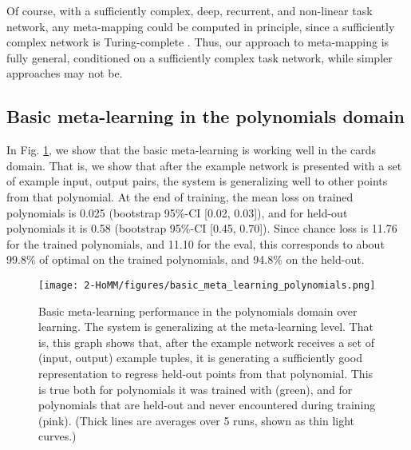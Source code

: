 Of course, with a sufficiently complex, deep, recurrent, and non-linear task network, any meta-mapping could be computed in principle, since a sufficiently complex network is Turing-complete \citep{Siegelman1992}. Thus, our approach to meta-mapping is fully general, conditioned on a sufficiently complex task network, while simpler approaches may not be.


\subsection{Basic meta-learning in the polynomials domain}

In Fig. \ref{supp_fig:HoMM:polynomials_basic_meta_learning}, we show that the basic meta-learning is working well in the cards domain. That is, we show that after the example network is presented with a set of example input, output pairs, the system is generalizing well to other points from that polynomial. At the end of training, the mean loss on trained polynomials is 0.025 (bootstrap 95\%-CI [0.02, 0.03]), and for held-out polynomials it is 0.58 (bootstrap 95\%-CI [0.45, 0.70]). Since chance loss is 11.76 for the trained polynomials, and 11.10 for the eval, this corresponds to about 99.8\% of optimal on the trained polynomials, and 94.8\% on the held-out.

\begin{figure}[H]
\centering
\texttt{[image: 2-HoMM/figures/basic\_meta\_learning\_polynomials.png]}
\caption[Basic meta-learning performance in the polynomials domain over learning.]{Basic meta-learning performance in the polynomials domain over learning. The system is generalizing at the meta-learning level. That is, this graph shows that, after the example network receives a set of (input, output) example tuples, it is generating a sufficiently good representation to regress held-out points from that polynomial. This is true both for polynomials it was trained with (green), and for polynomials that are held-out and never encountered during training (pink). (Thick lines are averages over 5 runs, shown as thin light curves.)} \label{supp_fig:HoMM:polynomials_basic_meta_learning}
\end{figure}

